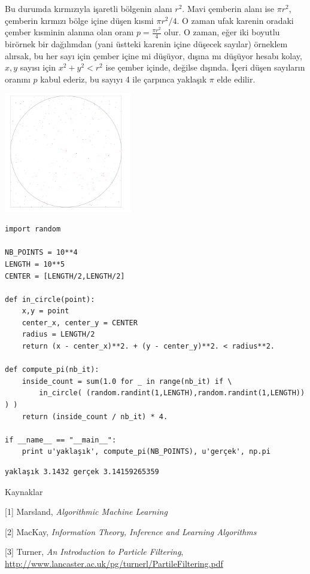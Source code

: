 \documentclass[12pt,fleqn]{article}\usepackage{../../common}
\begin{document}
Bu durumda kırmızıyla işaretli bölgenin alanı $r^2$. Mavi çemberin alanı
ise $\pi r^2$, çemberin kırmızı bölge içine düşen kısmi $\pi r^2 / 4$. O
zaman ufak karenin oradaki çember kısminin alanına olan oranı
$p = \frac{\pi r^2}{4}$ olur. O zaman, eğer iki boyutlu birörnek bir
dağılımdan (yani üstteki karenin içine düşecek sayılar) örneklem alırsak,
bu her sayı için çember içine mi düşüyor, dışına mı düşüyor hesabı kolay,
$x,y$ sayısı için $x^2+y^2 < r^2$ ise çember içinde, değilse dışında. İçeri
düşen sayıların oranını $p$ kabul ederiz, bu sayıyı 4 ile çarpınca yaklaşık
$\pi$ elde edilir.

\includegraphics[width=15em]{stat_mcmc_04.png}

\begin{verbatim}
import random

NB_POINTS = 10**4
LENGTH = 10**5
CENTER = [LENGTH/2,LENGTH/2]

def in_circle(point):
    x,y = point
    center_x, center_y = CENTER
    radius = LENGTH/2
    return (x - center_x)**2. + (y - center_y)**2. < radius**2.

def compute_pi(nb_it):
    inside_count = sum(1.0 for _ in range(nb_it) if \
        in_circle( (random.randint(1,LENGTH),random.randint(1,LENGTH)) ) )
    return (inside_count / nb_it) * 4.

if __name__ == "__main__":
    print u'yaklaşık', compute_pi(NB_POINTS), u'gerçek', np.pi
\end{verbatim}

\begin{verbatim}
yaklaşık 3.1432 gerçek 3.14159265359
\end{verbatim}

Kaynaklar

[1] Marsland, {\em Algorithmic Machine Learning}

[2] MacKay, {\em Information Theory, Inference and Learning Algorithms}

[3] Turner, {\em An Introduction to Particle Filtering}, \url{http://www.lancaster.ac.uk/pg/turnerl/PartileFiltering.pdf}
\end{document}
